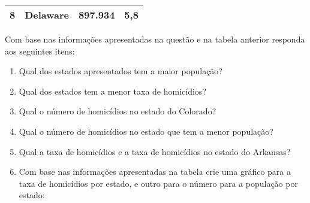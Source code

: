 \documentclass[oneside,a4paper,12pt]{article}
\begin{document}
\begin{enumerate}
\begin{table}[htb]
\begin{tabular}{p{1cm}lrc}
8 & Delaware & 897.934 & 5,8 \\ 
\hline
\end{tabular} 
\caption{} 
\label{tabela1}
\end{table}
Com base nas informações apresentadas na questão e na tabela anterior responda aos seguintes itens:
\begin{enumerate}
\item Qual dos estados apresentados tem a maior população?
\item Qual dos estados tem a menor taxa de homicídios?
\item Qual o número de homicídios no estado do Colorado?
\item Qual o número de homicídios no estado que tem a menor população?
\item Qual a taxa de homicídios e a taxa de homicídios no estado do Arkansas?
\item Com base nas informações apresentadas na tabela crie uma gráfico para a taxa de homicídios por estado, e outro para o número para a população por estado:

\end{enumerate}

\end{enumerate}
\end{document}

